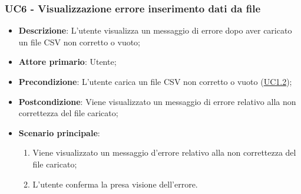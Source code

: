 
\subsubsection{UC6 - Visualizzazione errore inserimento dati da file}
\label{sub:uc6}
\begin{itemize}
    \item \textbf{Descrizione}: L'utente visualizza un messaggio di errore dopo aver caricato un file CSV non corretto 
    o vuoto;

    \item \textbf{Attore primario}: Utente;
    
    \item \textbf{Precondizione}:   L'utente carica un file CSV non corretto o vuoto (\hyperref[ssub:uc1.2]{UC1.2});

    \item \textbf{Postcondizione}:  Viene visualizzato un messaggio di errore relativo alla non correttezza del file 
    caricato;

    \item \textbf{Scenario principale}:
    \begin{enumerate}
        \item Viene visualizzato un messaggio d'errore relativo alla non correttezza del file caricato;
        \item L'utente conferma la presa visione dell'errore.
    \end{enumerate}

\end{itemize}



